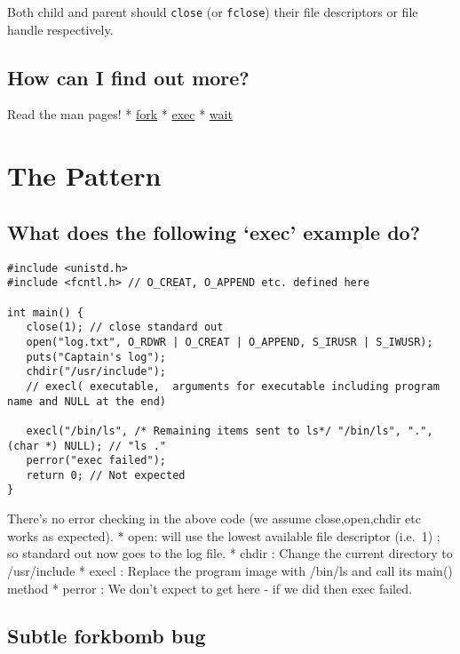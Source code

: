 Both child and parent should \texttt{close} (or \texttt{fclose}) their
file descriptors or file handle respectively.

\subsection{How can I find out more?}\label{how-can-i-find-out-more}

Read the man pages! *
\href{http://man7.org/linux/man-pages/man2/fork.2.html}{fork} *
\href{http://man7.org/linux/man-pages/man3/exec.3.html}{exec} *
\href{http://man7.org/linux/man-pages/man2/wait.2.html}{wait}

\section{The Pattern}\label{the-pattern}

\subsection{\texorpdfstring{What does the following `exec' example
do?}{What does the following exec example do?}}\label{what-does-the-following-exec-example-do}

\begin{verbatim}
#include <unistd.h>
#include <fcntl.h> // O_CREAT, O_APPEND etc. defined here

int main() {
   close(1); // close standard out
   open("log.txt", O_RDWR | O_CREAT | O_APPEND, S_IRUSR | S_IWUSR);
   puts("Captain's log");
   chdir("/usr/include");
   // execl( executable,  arguments for executable including program name and NULL at the end)

   execl("/bin/ls", /* Remaining items sent to ls*/ "/bin/ls", ".", (char *) NULL); // "ls ."
   perror("exec failed");
   return 0; // Not expected
}
\end{verbatim}

There's no error checking in the above code (we assume close,open,chdir
etc works as expected). * open: will use the lowest available file
descriptor (i.e.~1) ; so standard out now goes to the log file. * chdir
: Change the current directory to /usr/include * execl : Replace the
program image with /bin/ls and call its main() method * perror : We
don't expect to get here - if we did then exec failed.

\subsection{Subtle forkbomb bug}\label{subtle-forkbomb-bug}

